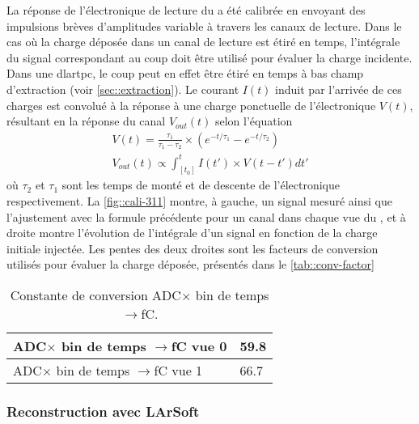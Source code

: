         La réponse de l'électronique de lecture du \TOO{} a été calibrée en envoyant des impulsions brèves d'amplitudes variable à travers les canaux de lecture. Dans le cas où la charge déposée dans un canal de lecture est étiré en temps, l'intégrale du signal correspondant au coup doit être utilisé pour évaluer la charge incidente. Dans une \gls{dlartpc}, le coup peut en effet être étiré en temps à bas champ d'extraction (voir \autoref{sec::extraction}). Le courant $I(t)$ induit par l'arrivée de ces charges est convolué à la réponse à une charge ponctuelle de l'électronique $V(t)$, résultant en la réponse du canal $V_{out}(t)$ selon l'équation
        \begin{eqnarray}\label{eq::resp-function}
          V(t) = \frac{\tau_1}{\tau_1-\tau_2}\times\left(e^{-t/\tau_1}-e^{-t/\tau_2}\right) \\ 
          V_{out}(t) \propto \int_{[t_0]}^{t} I(t')\times V(t-t')dt'
        \end{eqnarray}
        où $\tau_2$ et $\tau_1$ sont les temps de monté et de descente de l'électronique respectivement. La \autoref{fig::cali-311} montre, à gauche, un signal mesuré ainsi que l'ajustement avec la formule précédente pour un canal dans chaque vue du \TOO, et à droite montre l'évolution de l'intégrale d'un signal en fonction de la charge initiale injectée. Les pentes des deux droites sont les facteurs de conversion utilisés pour évaluer la charge déposée, présentés dans le \autoref{tab::conv-factor}
        \begin{table}[]
          \centering
          \begin{tabular}{|l|l|}
            \hline
            ADC$\times$ bin de temps $\to$\si{\femto\coulomb} vue 0 & 59.8 \\ \hline \hline
            ADC$\times$ bin de temps $\to$\si{\femto\coulomb} vue 1 & 66.7 \\ \hline
          \end{tabular}
          \caption[Constante de conversion ADC$\times$ bin de temps $\to$\si{\femto\coulomb}]{\label{tab::conv-factor}Constante de conversion ADC$\times$ bin de temps $\to$\si{\femto\coulomb}.}
        \end{table}

      \subsubsection{Reconstruction avec LArSoft}

